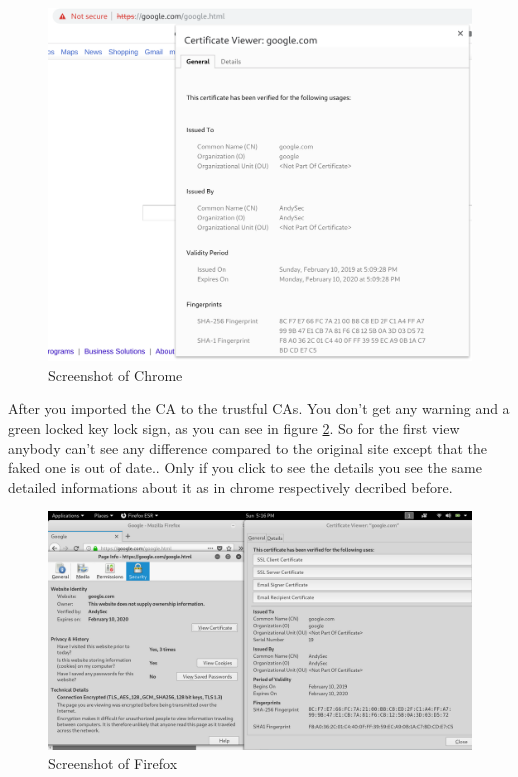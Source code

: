 \begin{figure}[htp]
    \centering
    \caption{Screenshot of Chrome}
    \label{fig:chrome}
    \includegraphics[width=\textwidth]{chrome.png}
\end{figure}

After you imported the CA to the trustful CAs. You don't get any warning and a green locked key lock sign, as you can see in figure \ref{fig:firefox}. So for the first view anybody can't see any difference compared to the original site except that the faked one is out of date.. 
Only if you click to see the details you see the same detailed informations about it as in chrome respectively decribed before.


\begin{figure}[htp]
    \centering
    \caption{Screenshot of Firefox}
    \label{fig:firefox}
    \includegraphics[width=\textwidth]{firefox.png}
\end{figure}


